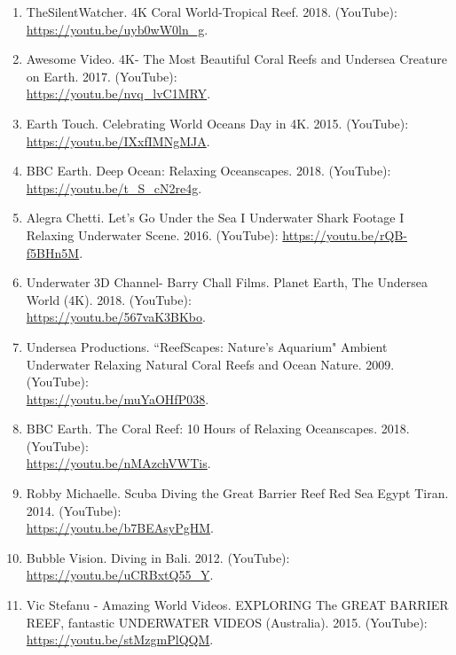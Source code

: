 \documentclass[10pt,twocolumn,letterpaper]{article}
\begin{document}
{\begin{enumerate}
    




    \item TheSilentWatcher. 4K Coral World-Tropical Reef. 2018. (YouTube):
    \url{https://youtu.be/uyb0wW0ln_g}.
    
    \item Awesome Video. 4K- The Most Beautiful Coral Reefs and Undersea Creature on Earth. 2017. (YouTube): \\
    \url{https://youtu.be/nvq_lvC1MRY}.
    
    \item Earth Touch. Celebrating World Oceans Day in 4K. 2015. (YouTube):
    \url{https://youtu.be/IXxfIMNgMJA}.
    
    \item BBC Earth. Deep Ocean: Relaxing Oceanscapes. 2018. (YouTube):
    \url{https://youtu.be/t_S_cN2re4g}.
    
    \item Alegra Chetti. Let's Go Under the Sea I Underwater Shark Footage I Relaxing Underwater Scene. 2016. (YouTube):
    \url{https://youtu.be/rQB-f5BHn5M}.
    
    \item Underwater 3D Channel- Barry Chall Films. Planet Earth, The Undersea World (4K). 2018. (YouTube): \\
    \url{https://youtu.be/567vaK3BKbo}.
    
    \item Undersea Productions. ``ReefScapes: Nature's Aquarium" Ambient Underwater Relaxing Natural Coral Reefs and Ocean Nature. 2009. (YouTube): \\
    \url{https://youtu.be/muYaOHfP038}.
    
    \item BBC Earth. The Coral Reef: 10 Hours of Relaxing Oceanscapes. 2018. (YouTube): \\
    \url{https://youtu.be/nMAzchVWTis}.
    
    \item Robby Michaelle. Scuba Diving the Great Barrier Reef Red Sea Egypt Tiran. 2014. (YouTube): \\
    \url{https://youtu.be/b7BEAsyPgHM}.
    
    \item Bubble Vision. Diving in Bali. 2012. (YouTube): \\
    \url{https://youtu.be/uCRBxtQ55_Y}. 
    
    \item Vic Stefanu - Amazing World Videos. EXPLORING The GREAT BARRIER REEF, fantastic UNDERWATER VIDEOS (Australia). 2015. (YouTube): \\
    \url{https://youtu.be/stMzgmPlQQM}.
    

\end{enumerate}}
\end{document}
